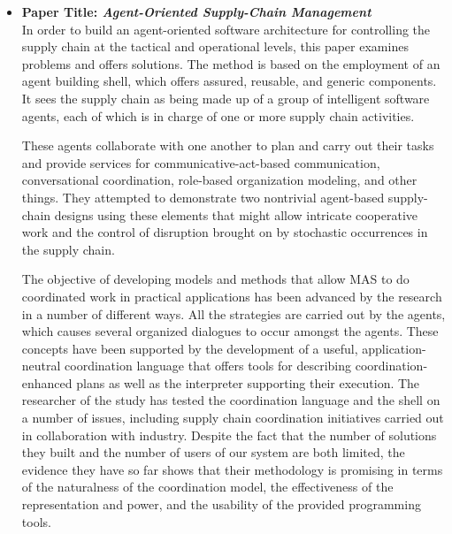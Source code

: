 \begin{itemize}[label={}]
\vspace{.5cm}

\item \textbf{Paper Title: \textit{Agent-Oriented Supply-Chain Management}} \\

In order to build an agent-oriented software architecture for controlling the supply chain at the tactical and operational levels, this paper \cite{agSupch} examines problems and offers solutions. The method is based on the employment of an agent building shell, which offers assured, reusable, and generic components. It sees the supply chain as being made up of a group of intelligent software agents, each of which is in charge of one or more supply chain activities. 

\vspace{.5cm}

These agents collaborate with one another to plan and carry out their tasks and provide services for communicative-act-based communication, conversational coordination, role-based organization modeling, and other things. They attempted to demonstrate two nontrivial agent-based supply-chain designs using these elements that might allow intricate cooperative work and the control of disruption brought on by stochastic occurrences in the supply chain.

\vspace{.5cm}

The objective of developing models and methods that allow \ac{MAS} to do coordinated work in practical applications has been advanced by the research in a number of different ways. All the strategies are carried out by the agents, which causes several organized dialogues to occur amongst the agents. These concepts have been supported by the development of a useful, application-neutral coordination language that offers tools for describing coordination-enhanced plans as well as the interpreter supporting their execution. The researcher of the study has tested the coordination language and the shell on a number of issues, including supply chain coordination initiatives carried out in collaboration with industry. Despite the fact that the number of solutions they built and the number of users of our system are both limited, the evidence they have so far shows that their methodology is promising in terms of the naturalness of the coordination model, the effectiveness of the representation and power, and the usability of the provided programming tools.
\end{itemize}

